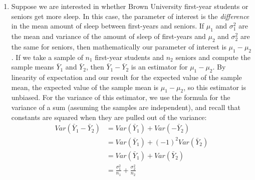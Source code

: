 \documentclass[12pt]{article}
\theoremstyle{definition}
\theoremstyle{remark}
\begin{document}
\begin{enumerate}
\item Suppose we are interested in whether Brown University first-year students or seniors get more sleep. In this case, the parameter of interest is the \emph{difference} in the mean amount of sleep between first-years and seniors. If $\mu_1$ and $\sigma^2_1$ are the mean and variance of the amount of sleep of first-years and $\mu_2$ and $\sigma^2_2$ are the same for seniors, then mathematically our parameter of interest is $\mu_1 - \mu_2$. If we take a sample of $n_1$ first-year students and $n_2$ seniors and compute the sample means $\bar{Y}_1$ and $\bar{Y}_2$, then $\bar{Y}_1 - \bar{Y}_2$ is an estimator for $\mu_1 - \mu_2$. By linearity of expectation and our result for the expected value of the sample mean, the expected value of the sample mean is $\mu_1 - \mu_2$, so this estimator is unbiased. For the variance of this estimator, we use the formula for the variance of a sum (assuming the samples are independent), and recall that constants are squared when they are pulled out of the variance:
\begin{align*}
Var(\bar{Y}_1 - \bar{Y}_2) &= Var(\bar{Y}_1) + Var(-\bar{Y}_2) \\
&= Var(\bar{Y}_1) + (-1)^2 Var(\bar{Y}_2) \\
&= Var(\bar{Y}_1) + Var(\bar{Y}_2) \\
&= \frac{\sigma^2_1}{n_1} + \frac{\sigma^2_2}{n_2}
\end{align*}


\end{enumerate}
\end{document}
